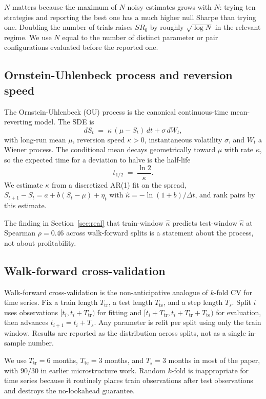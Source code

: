 \documentclass[11pt]{article}
\begin{document}
$N$ matters because the maximum of $N$ noisy estimates grows with $N$: trying ten
strategies and reporting the best one has a much higher null Sharpe than trying one.
Doubling the number of trials raises $SR_0$ by roughly $\sqrt{\log N}$ in the relevant
regime. We use $N$ equal to the number of distinct parameter or pair configurations
evaluated before the reported one.

\subsection{Ornstein-Uhlenbeck process and reversion speed}
\label{app:ou}

The Ornstein-Uhlenbeck (OU) process is the canonical continuous-time mean-reverting model.
The SDE is
\[
dS_t \;=\; \kappa \, (\mu - S_t) \, dt + \sigma \, dW_t,
\]
with long-run mean $\mu$, reversion speed $\kappa > 0$, instantaneous volatility $\sigma$,
and $W_t$ a Wiener process. The conditional mean decays geometrically toward $\mu$ with
rate $\kappa$, so the expected time for a deviation to halve is the half-life
\[
t_{1/2} \;=\; \frac{\ln 2}{\kappa}.
\]
We estimate $\kappa$ from a discretized AR(1) fit on the spread,
$S_{t+1} - S_t = a + b (S_t - \mu) + \eta_t$ with $\hat{\kappa} = -\ln(1 + b) / \Delta t$,
and rank pairs by this estimate.

The finding in Section~\ref{sec:real} that train-window $\hat\kappa$ predicts test-window
$\hat\kappa$ at Spearman $\rho = 0.46$ across walk-forward splits is a statement about the
process, not about profitability.

\subsection{Walk-forward cross-validation}
\label{app:wf}

Walk-forward cross-validation is the non-anticipative analogue of $k$-fold CV for time
series. Fix a train length $T_{\mathrm{tr}}$, a test length $T_{\mathrm{te}}$, and a step
length $T_s$. Split $i$ uses observations $[t_i, t_i + T_{\mathrm{tr}})$ for fitting and
$[t_i + T_{\mathrm{tr}}, t_i + T_{\mathrm{tr}} + T_{\mathrm{te}})$ for evaluation, then
advances $t_{i+1} = t_i + T_s$. Any parameter is refit per split using only the train
window. Results are reported as the distribution across splits, not as a single in-sample
number.

We use $T_{\mathrm{tr}} = 6$ months, $T_{\mathrm{te}} = 3$ months, and $T_s = 3$ months in
most of the paper, with $90/30$ in earlier microstructure work. Random $k$-fold is
inappropriate for time series because it routinely places train observations after test
observations and destroys the no-lookahead guarantee.
\end{document}
